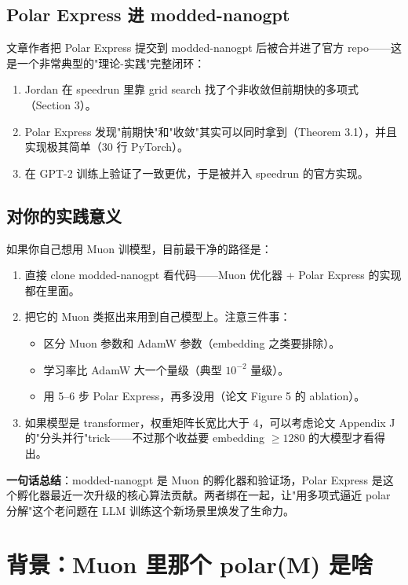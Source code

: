 \documentclass[11pt]{article}
\begin{document}
\subsection{Polar Express 进 modded-nanogpt}

文章作者把 Polar Express 提交到 modded-nanogpt 后被合并进了官方 repo——这是一个非常典型的"理论-实践"完整闭环：
\begin{enumerate}
\item Jordan 在 speedrun 里靠 grid search 找了个非收敛但前期快的多项式（Section 3）。
\item Polar Express 发现"前期快"和"收敛"其实可以同时拿到（Theorem 3.1），并且实现极其简单（30 行 PyTorch）。
\item 在 GPT-2 训练上验证了一致更优，于是被并入 speedrun 的官方实现。
\end{enumerate}

\subsection{对你的实践意义}

如果你自己想用 Muon 训模型，目前最干净的路径是：

\begin{enumerate}
\item 直接 clone modded-nanogpt 看代码——Muon 优化器 + Polar Express 的实现都在里面。
\item 把它的 Muon 类抠出来用到自己模型上。注意三件事：
\begin{itemize}
\item 区分 Muon 参数和 AdamW 参数（embedding 之类要排除）。
\item 学习率比 AdamW 大一个量级（典型 $10^{-2}$ 量级）。
\item 用 5--6 步 Polar Express，再多没用（论文 Figure 5 的 ablation）。
\end{itemize}
\item 如果模型是 transformer，权重矩阵长宽比大于 4，可以考虑论文 Appendix J 的"分头并行"trick——不过那个收益要 embedding $\geq 1280$ 的大模型才看得出。
\end{enumerate}

\textbf{一句话总结}：modded-nanogpt 是 Muon 的孵化器和验证场，Polar Express 是这个孵化器最近一次升级的核心算法贡献。两者绑在一起，让"用多项式逼近 polar 分解"这个老问题在 LLM 训练这个新场景里焕发了生命力。

\section{背景：Muon 里那个 polar(M) 是啥}
\end{document}

